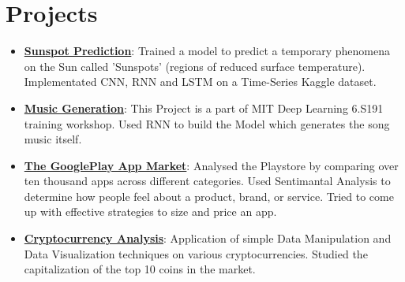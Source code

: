 \documentclass[letterpaper,11pt]{article}
\newcommand{\resumeItem}[2]{
  \item\small{
    \textbf{#1}{: #2 \vspace{-2pt}}
  }
}
\newcommand{\resumeSubItem}[2]{\resumeItem{#1}{#2}\vspace{-4pt}}
\newcommand{\resumeSubHeadingListStart}{\begin{itemize}[leftmargin=*]}
\newcommand{\resumeSubHeadingListEnd}{\end{itemize}}
\begin{document}
\section{Projects}
  \resumeSubHeadingListStart
    \resumeSubItem{\href{https://github.com/shashwatroy/Sunspot-Prediction}{Sunspot Prediction}}
      {Trained a model to predict a temporary phenomena on the Sun called 'Sunspots' (regions of reduced surface temperature). Implementated CNN, RNN and LSTM on a Time-Series Kaggle dataset.}
    \resumeSubItem{\href{https://github.com/shashwatroy/Music-Generation}{Music Generation}}
      {This Project is a part of MIT Deep Learning 6.S191 training workshop. Used RNN to build the Model which generates the song music itself.}
    \resumeSubItem{\href{https://github.com/shashwatroy/The-Google-Playstore}{The GooglePlay App Market}}
      {Analysed the Playstore by comparing over ten thousand apps across different categories. Used Sentimantal Analysis to determine how people feel about a product, brand, or service. Tried to come up with effective strategies to size and price an app.}
     \resumeSubItem{\href{https://github.com/shashwatroy/Cryptocurrency-Analysis}{Cryptocurrency Analysis}}
      {Application of simple Data Manipulation and Data Visualization techniques on various cryptocurrencies. Studied the capitalization of the top 10 coins in the market.}
  \resumeSubHeadingListEnd

%


\end{document}

